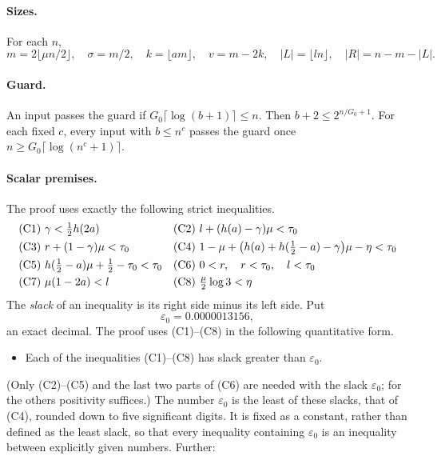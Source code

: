 \documentclass[11pt]{article}
\theoremstyle{definition}
\newcommand{\eps}{\varepsilon}
\newcommand{\abs}[1]{\lvert #1\rvert}
\newcommand{\floor}[1]{\lfloor #1\rfloor}
\newcommand{\ceil}[1]{\lceil #1\rceil}
\begin{document}
\paragraph{Sizes.} For each $n$,
\[
 m=2\floor{\mu n/2},\quad \sigma=m/2,\quad k=\floor{am},\quad v=m-2k,\quad \abs L=\floor{ln},\quad \abs R=n-m-\abs L .
\]

\paragraph{Guard.} An input passes the guard if $G_0\ceil{\log(b+1)}\le n$. Then $b+2\le 2^{n/G_0+1}$. For each fixed
$c$, every input with $b\le n^c$ passes the guard once $n\ge G_0\ceil{\log(n^c+1)}$.

\paragraph{Scalar premises.} The proof uses exactly the following strict inequalities.
\begin{align*}
&\textup{(C1)}\ \gamma<\tfrac12h(2a) &&\textup{(C2)}\ l+(h(a)-\gamma)\mu<\tau_0\\
&\textup{(C3)}\ r+(1-\gamma)\mu<\tau_0 &&\textup{(C4)}\ 1-\mu+\bigl(h(a)+h(\tfrac12-a)-\gamma\bigr)\mu-\eta<\tau_0\\
&\textup{(C5)}\ h(\tfrac12-a)\mu+\tfrac12-\tau_0<\tau_0 &&\textup{(C6)}\ 0<r,\quad r<\tau_0,\quad l<\tau_0\\
&\textup{(C7)}\ \mu(1-2a)<l &&\textup{(C8)}\ \tfrac\mu2\log3<\eta
\end{align*}
The \emph{slack} of an inequality is its right side minus its left side. Put
\[
 \eps_0=0.0000013156 ,
\]
an exact decimal. The proof uses \textup{(C1)--(C8)} in the following quantitative form.
\begin{itemize}[leftmargin=3.2em]
\item[\textup{(E0)}] Each of the inequalities \textup{(C1)--(C8)} has slack greater than $\eps_0$.
\end{itemize}
(Only \textup{(C2)--(C5)} and the last two parts of \textup{(C6)} are needed with the slack $\eps_0$; for the
others positivity suffices.) The number $\eps_0$ is the least of these slacks, that of \textup{(C4)}, rounded down
to five significant digits. It is fixed as a constant, rather than defined as the least slack, so that every
inequality containing $\eps_0$ is an inequality between explicitly given numbers. Further:
\end{document}
